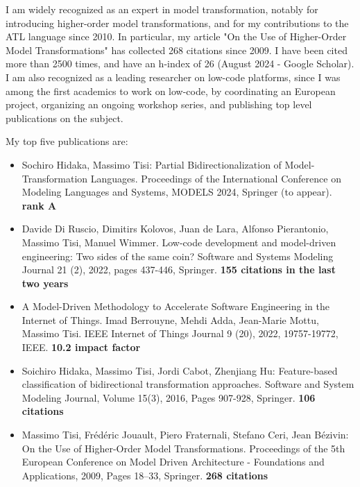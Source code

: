 I am widely recognized as an expert in model transformation, notably for introducing higher-order model transformations, and for my contributions to the ATL language since 2010. In particular, my article "On the Use of Higher-Order Model Transformations" has collected 268 citations since 2009. I have been cited more than 2500 times, and have an h-index of 26 (August 2024 - Google Scholar). I am also recognized as a leading researcher on low-code platforms, since I was among the first academics to work on low-code, by coordinating an European project, organizing an ongoing workshop series, and publishing top level publications on the subject. 

\medskip
My top five publications are:
\begin{itemize}
\item Sochiro Hidaka, Massimo Tisi: Partial Bidirectionalization of Model-Transformation Languages. Proceedings of the International Conference on Modeling Languages and Systems, MODELS 2024, Springer (to appear). \textbf{rank A}
\item Davide Di Ruscio, Dimitirs Kolovos, Juan de Lara, Alfonso Pierantonio, Massimo Tisi, Manuel Wimmer. Low-code development and model-driven engineering: Two sides of the same coin? Software and Systems Modeling Journal 21 (2), 2022, pages 437-446, Springer. \textbf{155 citations in the last two years}
\item A Model-Driven Methodology to Accelerate Software Engineering in the Internet of Things. Imad Berrouyne, Mehdi Adda, Jean-Marie Mottu, Massimo Tisi. IEEE Internet of Things Journal 9 (20), 2022, 19757-19772, IEEE. \textbf{10.2 impact factor}
\item Soichiro Hidaka, Massimo Tisi, Jordi Cabot, Zhenjiang Hu: Feature-based classification of bidirectional transformation approaches. Software and System Modeling Journal, Volume 15(3), 2016, Pages 907-928, Springer. \textbf{106 citations} 
\item Massimo Tisi, Frédéric Jouault, Piero Fraternali, Stefano Ceri, Jean Bézivin: On the Use of Higher-Order Model Transformations. Proceedings of the 5th European Conference on Model Driven Architecture - Foundations and Applications, 2009, Pages 18–33, Springer. \textbf{268 citations}
\end{itemize}

